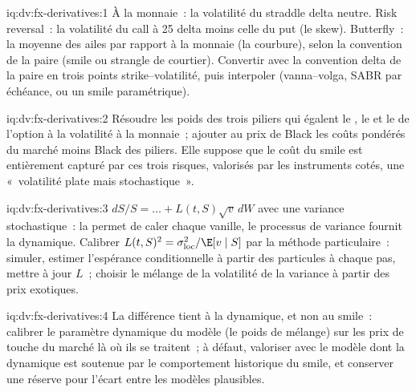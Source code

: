 \begin{solution}{iq:dv:fx-derivatives:1}
À la monnaie~: la volatilité du straddle delta neutre. Risk reversal~: la volatilité du call à 25 delta moins celle du put (le skew). Butterfly~: la moyenne des ailes
par rapport à la monnaie (la courbure), selon la convention de la paire (smile ou strangle de courtier). Convertir avec la convention delta de la paire en trois
points strike--volatilité, puis interpoler (vanna--volga, SABR par échéance, ou un smile paramétrique).
\end{solution}

\begin{solution}{iq:dv:fx-derivatives:2}
Résoudre les poids des trois piliers qui égalent le , le  et le  de l'option à la volatilité à la monnaie~; ajouter au prix de Black les coûts pondérés du marché moins Black
des piliers. Elle suppose que le coût du smile est entièrement capturé par ces trois risques, valorisés par les instruments cotés, une «~volatilité plate mais
stochastique~».
\end{solution}

\begin{solution}{iq:dv:fx-derivatives:3}
$dS/S=\dots+L(t,S)\sqrt v\,dW$ avec une variance stochastique~: la  permet de caler chaque vanille, le processus de variance fournit la dynamique.
Calibrer $L(t,S)^2=\sigma_{\mathrm{loc}}^2/\E[v\mid S]$ par la méthode particulaire~: simuler, estimer l'espérance conditionnelle à partir des particules à chaque pas,
mettre à jour $L$~; choisir le mélange de la volatilité de la variance à partir des prix exotiques.
\end{solution}

\begin{solution}{iq:dv:fx-derivatives:4}
La différence tient à la dynamique, et non au smile~: calibrer le paramètre dynamique du modèle (le poids de mélange) sur les prix de touche du marché là où ils se traitent~;
à défaut, valoriser avec le modèle dont la dynamique est soutenue par le comportement historique du smile, et conserver une réserve pour l'écart entre les
modèles plausibles.
\end{solution}

